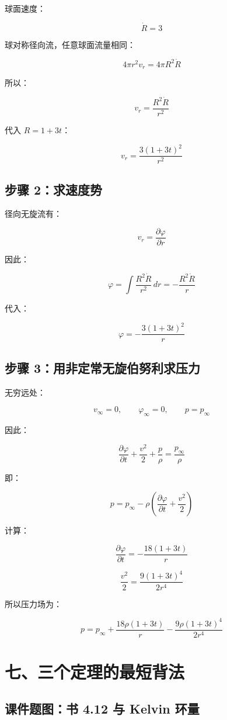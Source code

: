 \documentclass[11pt,a4paper]{ctexart}
\begin{document}
球面速度：

\[
\dot R=3
\]

球对称径向流，任意球面流量相同：

\[
4\pi r^2v_r=4\pi R^2\dot R
\]

所以：

\[
v_r=\frac{R^2\dot R}{r^2}
\]

代入 \(R=1+3t\)：

\[
\boxed{
v_r=\frac{3(1+3t)^2}{r^2}
}
\]

\subsection*{步骤 2：求速度势}

径向无旋流有：

\[
v_r=\frac{\partial\varphi}{\partial r}
\]

因此：

\[
\varphi=\int \frac{R^2\dot R}{r^2}\,dr
=-\frac{R^2\dot R}{r}
\]

代入：

\[
\boxed{
\varphi=-\frac{3(1+3t)^2}{r}
}
\]

\subsection*{步骤 3：用非定常无旋伯努利求压力}

无穷远处：

\[
v_\infty=0,\qquad \varphi_\infty=0,\qquad p=p_\infty
\]

因此：

\[
\frac{\partial\varphi}{\partial t}
+\frac{v^2}{2}
+\frac{p}{\rho}
=
\frac{p_\infty}{\rho}
\]

即：

\[
p=p_\infty-\rho
\left(
\frac{\partial\varphi}{\partial t}
+\frac{v^2}{2}
\right)
\]

计算：

\[
\frac{\partial\varphi}{\partial t}
=-\frac{18(1+3t)}{r}
\]

\[
\frac{v^2}{2}
=
\frac{9(1+3t)^4}{2r^4}
\]

所以压力场为：

\[
\boxed{
p=p_\infty
+\frac{18\rho(1+3t)}{r}
-\frac{9\rho(1+3t)^4}{2r^4}
}
\]

\section*{七、三个定理的最短背法}

\subsection*{课件题图：书 4.12 与 Kelvin 环量}
\end{document}
